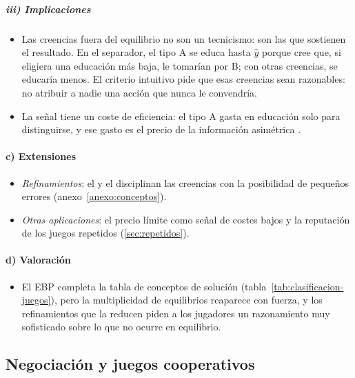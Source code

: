 \documentclass[11pt]{article}
\begin{document}
\subparagraph{iii) Implicaciones}

\begin{itemize}
\item Las creencias fuera del equilibrio no son un tecnicismo: son las que sostienen el resultado. En el separador, el tipo A se educa hasta $\hat y$ porque cree que, si eligiera una educación más baja, le tomarían por B; con otras creencias, se educaría menos. El criterio intuitivo pide que esas creencias sean razonables: no atribuir a nadie una acción que nunca le convendría.
\item La señal tiene un coste de eficiencia: el tipo A gasta en educación solo para distinguirse, y ese gasto es el precio de la información asimétrica .
\end{itemize}

\paragraph{c) Extensiones}

\begin{itemize}
\item \emph{Refinamientos}: el  y el  disciplinan las creencias con la posibilidad de pequeños errores (anexo~\ref{anexo:conceptos}).
\item \emph{Otras aplicaciones}: el precio límite como señal de costes bajos\nocite{MilgromRoberts1982Limit}  y la reputación de los juegos repetidos (\ref{sec:repetidos}).
\end{itemize}

\paragraph{d) Valoración}

\begin{itemize}
\item El EBP completa la tabla de conceptos de solución (tabla~\ref{tab:clasificacion-juegos}), pero la multiplicidad de equilibrios reaparece con fuerza, y los refinamientos que la reducen piden a los jugadores un razonamiento muy sofisticado sobre lo que no ocurre en equilibrio.
\end{itemize}

\subsection{Negociación y juegos cooperativos}\label{sec:negociacion-cooperativos}
\end{document}
